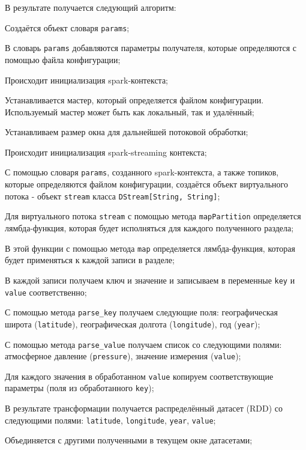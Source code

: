 В результате получается следующий алгоритм:
\begin{enumerate_step}
    \item Создаётся объект словаря \texttt{params};
    \item В словарь \texttt{params} добавляются параметры получателя, которые определяются с помощью файла конфигурации;
    \item Происходит инициализация spark-контекста;
    \item Устанавливается мастер, который определяется файлом конфигурации. 
    Используемый мастер может быть как локальный, так и удалённый;
    \item Устанавливаем размер окна для дальнейшей потоковой обработки;
    \item Происходит инициализация spark-streaming контекста;
    \item С помощью словаря \texttt{params}, созданного spark-контекста, а также топиков, которые определяются файлом конфигурации, создаётся объект виртуального потока - объект \texttt{stream} класса \texttt{DStream[String, String]};
    \item Для виртуального потока \texttt{stream} с помощью метода \texttt{mapPartition} определяется лямбда-функция, которая будет исполняться для каждого полученного раздела;
    \item В этой функции с помощью метода \texttt{map} определяется лямбда-функция, которая будет применяться к каждой записи в разделе;
    \item \label{i:gbt:map} В каждой записи получаем ключ и значение и записываем в переменные \texttt{key} и \texttt{value} соответственно;
    \item С помощью метода \texttt{parse\_key} получаем следующие поля: географическая широта (\texttt{latitude}), географическая долгота (\texttt{longitude}), год (\texttt{year});
    \item С помощью метода \texttt{parse\_value} получаем список со следующими полями: атмосферное давление (\texttt{pressure}), значение измерения (\texttt{value});
    \item Для каждого значения в обработанном \texttt{value} копируем соответствующие параметры (поля из обработанного \texttt{key});
    \item В результате трансформации получается распределённый датасет (RDD) со следующими полями: \texttt{latitude}, \texttt{longitude}, \texttt{year}, \texttt{value};
    \item Объединяется с другими полученными в текущем окне датасетами;

\end{enumerate_step}
